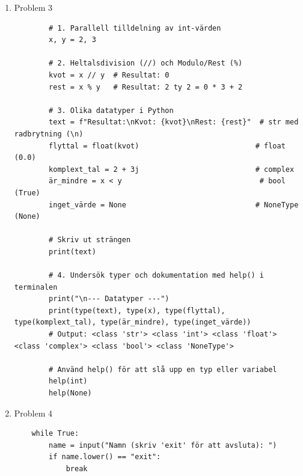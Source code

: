 \documentclass[11pt,a4paper]{article}
\begin{document}
\begin{enumerate}
\begin{lstlisting}
            rapport_text = hälsning + " - Standard skylt"  # FIX: Deklarerar variabeln utanför if-blocket så den inte får för kort räckvidd (ScopeError)
            
            if area >= 50:  # FIX: Ändrade den felaktiga operatorn => till den korrekta >= (större än eller lika med)
                status_kod = 10
                if status_kod == 10:  # FIX: Bytte tilldelningsoperatorn (=) mot jämförelseoperatorn (==) inuti villkoret
                    rapport_text = hälsning + " - Stor skylt"
                    
            print(rapport_text)
            räknare = räknare + 1 

            '''
            I detta fall kommer output bli:
            Skylt skapad av Karolina - Standard skylt

            Om area >= 50, output blir:
            Skylt skapad av Karolina - Stor skylt
            '''

        skapa_skylt_rapport()
    \end{lstlisting}
    \item Problem 3
    \begin{lstlisting}
        # 1. Parallell tilldelning av int-värden
        x, y = 2, 3

        # 2. Heltalsdivision (//) och Modulo/Rest (%)
        kvot = x // y  # Resultat: 0
        rest = x % y   # Resultat: 2 ty 2 = 0 * 3 + 2

        # 3. Olika datatyper i Python
        text = f"Resultat:\nKvot: {kvot}\nRest: {rest}"  # str med radbrytning (\n)
        flyttal = float(kvot)                           # float (0.0)
        komplext_tal = 2 + 3j                           # complex
        är_mindre = x < y                                # bool (True)
        inget_värde = None                              # NoneType (None)

        # Skriv ut strängen
        print(text)

        # 4. Undersök typer och dokumentation med help() i terminalen
        print("\n--- Datatyper ---")
        print(type(text), type(x), type(flyttal), type(komplext_tal), type(är_mindre), type(inget_värde))
        # Output: <class 'str'> <class 'int'> <class 'float'> <class 'complex'> <class 'bool'> <class 'NoneType'>

        # Använd help() för att slå upp en typ eller variabel
        help(int)
        help(None)
    \end{lstlisting}
    \item Problem 4
    \begin{lstlisting}
    while True:
        name = input("Namn (skriv 'exit' för att avsluta): ")
        if name.lower() == "exit":
            break


\end{lstlisting}
\end{enumerate}
\end{document}
